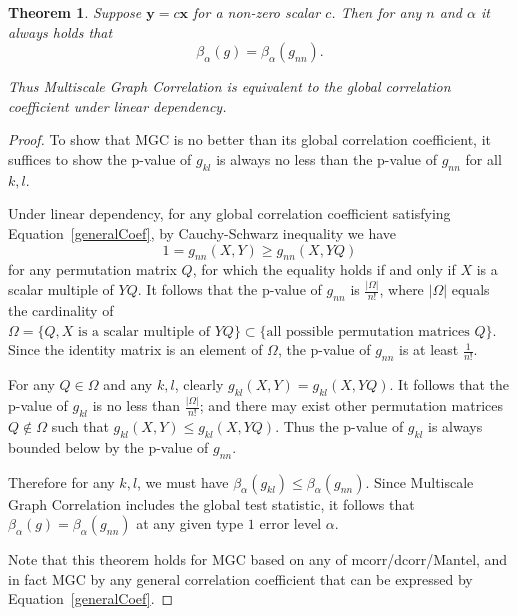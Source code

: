 \documentclass[11pt]{article}
\providecommand{\mb}[1]{\boldsymbol{#1}}
\newtheorem{thm}{Theorem}
\begin{document}
\begin{thm}
Suppose $\mb{y}=c\mb{x}$ for a non-zero scalar $c$. Then for any $n$ and $\alpha$ it always holds that
\begin{equation}
\beta_{\alpha}(g) = \beta_{\alpha}(g_{nn}).
\end{equation}

Thus Multiscale Graph Correlation is equivalent to the global correlation coefficient under linear dependency.
\end{thm}
\begin{proof}
To show that MGC is no better than its global correlation coefficient, it suffices to show the p-value of $g_{kl}$ is always no less than the p-value of $g_{nn}$ for all $k,l$.


Under linear dependency, for any global correlation coefficient satisfying Equation~\ref{generalCoef}, by Cauchy-Schwarz inequality we have
\begin{equation}
1=g_{nn}(X, Y) \geq g_{nn}(X, YQ)
\end{equation}
for any permutation matrix $Q$, for which the equality holds if and only if $X$ is a scalar multiple of $YQ$. It follows that the p-value of $g_{nn}$ is $\frac{|\Omega|}{n!}$, where $|\Omega|$ equals the cardinality of $\Omega=\{Q, X \mbox{ is a scalar multiple of }YQ\} \subset \{\mbox{all possible permutation matrices }Q\}$. Since the identity matrix is an element of $\Omega$, the p-value of $g_{nn}$ is at least $\frac{1}{n!}$.

For any $Q \in \Omega$ and any $k,l$, clearly $g_{kl}(X,Y)=g_{kl}(X,YQ)$. It follows that the p-value of $g_{kl}$ is no less than $\frac{|\Omega|}{n!}$; and there may exist other permutation matrices $Q \notin \Omega$ such that $g_{kl}(X,Y) \leq g_{kl}(X,YQ)$. Thus the p-value of $g_{kl}$ is always bounded below by the p-value of $g_{nn}$.

Therefore for any $k,l$, we must have $\beta_{\alpha}(g_{kl}) \leq \beta_{\alpha}(g_{nn})$. Since Multiscale Graph Correlation includes the global test statistic, it follows that $\beta_{\alpha}(g) = \beta_{\alpha}(g_{nn})$ at any given type $1$ error level $\alpha$.

Note that this theorem holds for MGC based on any of mcorr/dcorr/Mantel, and in fact MGC by any general correlation coefficient that can be expressed by Equation~\ref{generalCoef}.
\end{proof}
\end{document}
